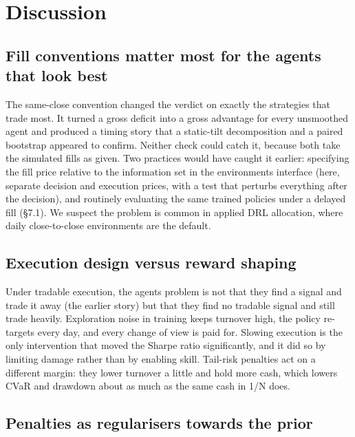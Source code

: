 \documentclass[11pt]{article}
\begin{document}
\section{Discussion}\label{s9}

\subsection{Fill conventions matter most for the agents that look best}\label{fill-conventions-matter-most-for-the-agents-that-look-best}

The same-close convention changed the verdict on exactly the strategies that trade most. It turned a gross deficit into a gross advantage for every unsmoothed agent and produced a timing story that a static-tilt decomposition and a paired bootstrap appeared to confirm. Neither check could catch it, because both take the simulated fills as given. Two practices would have caught it earlier: specifying the fill price relative to the information set in the environment\textquotesingle s interface (here, separate decision and execution prices, with a test that perturbs everything after the decision), and routinely evaluating the same trained policies under a delayed fill (\S{}7.1). We suspect the problem is common in applied DRL allocation, where daily close-to-close environments are the default.

\subsection{Execution design versus reward shaping}\label{execution-design-versus-reward-shaping}

Under tradable execution, the agents\textquotesingle{} problem is not that they find a signal and trade it away (the earlier story) but that they find no tradable signal and still trade heavily. Exploration noise in training keeps turnover high, the policy re-targets every day, and every change of view is paid for. Slowing execution is the only intervention that moved the Sharpe ratio significantly, and it did so by limiting damage rather than by enabling skill. Tail-risk penalties act on a different margin: they lower turnover a little and hold more cash, which lowers CVaR and drawdown about as much as the same cash in 1/N does.

\subsection{Penalties as regularisers towards the prior}\label{penalties-as-regularisers-towards-the-prior}
\end{document}
